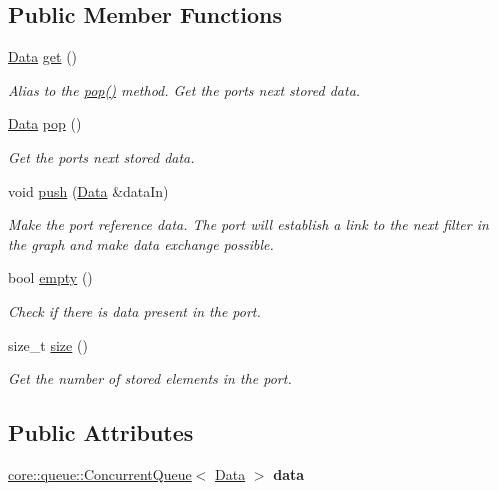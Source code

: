 \subsection*{Public Member Functions}
\begin{DoxyCompactItemize}
\item 
\hyperlink{classfilter_1_1data_1_1_data}{Data} \hyperlink{classfilter_1_1data_1_1_data_port_aab5c7164e7da8e31c92221ccbbcdfc82}{get} ()
\begin{DoxyCompactList}\small\item\em Alias to the \hyperlink{classfilter_1_1data_1_1_data_port_a236dbb70802799eb937cec5020b78bdd}{pop()} method. Get the port\textquotesingle{}s next stored data. \end{DoxyCompactList}\item 
\hyperlink{classfilter_1_1data_1_1_data}{Data} \hyperlink{classfilter_1_1data_1_1_data_port_a236dbb70802799eb937cec5020b78bdd}{pop} ()
\begin{DoxyCompactList}\small\item\em Get the port\textquotesingle{}s next stored data. \end{DoxyCompactList}\item 
void \hyperlink{classfilter_1_1data_1_1_data_port_ac3701e8da30bbc0d5f47a8dffc3dea23}{push} (\hyperlink{classfilter_1_1data_1_1_data}{Data} \&data\+In)
\begin{DoxyCompactList}\small\item\em Make the port reference data. The port will establish a link to the next filter in the graph and make data exchange possible. \end{DoxyCompactList}\item 
bool \hyperlink{classfilter_1_1data_1_1_data_port_ad06844afc36ff14f5d254a2f6ebf748a}{empty} ()
\begin{DoxyCompactList}\small\item\em Check if there is data present in the port. \end{DoxyCompactList}\item 
size\+\_\+t \hyperlink{classfilter_1_1data_1_1_data_port_aa1adeffd41c34c3d8780daa2bbf9742f}{size} ()
\begin{DoxyCompactList}\small\item\em Get the number of stored elements in the port. \end{DoxyCompactList}\end{DoxyCompactItemize}
\subsection*{Public Attributes}
\begin{DoxyCompactItemize}
\item 
\mbox{\label{classfilter_1_1data_1_1_data_port_a0e7a5ee9ccff4a10283909f4da8d6626}} 
\hyperlink{classcore_1_1queue_1_1_concurrent_queue}{core\+::queue\+::\+Concurrent\+Queue}$<$ \hyperlink{classfilter_1_1data_1_1_data}{Data} $>$ {\bfseries data}
\end{DoxyCompactItemize}


